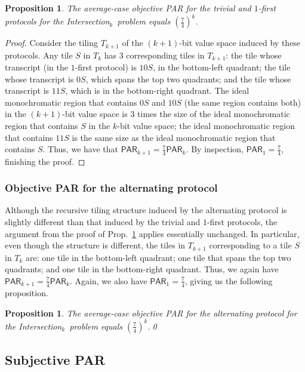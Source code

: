 \documentclass{article}
\theoremstyle{theorem}
\newtheorem{prop}[theorem]{Proposition}
\theoremstyle{definition}
\theoremstyle{remark}
\newcommand{\intersection}{{\sc In\-ter\-sec\-tion}\ensuremath{_k}}
\newcommand{\paratio}{\ensuremath{\mathsf{PAR}}}
\begin{document}
\begin{prop}\label{prop:int-ob-triv}
The average-case objective PAR for the trivial and $1$-first protocols for the \intersection\ problem equals $\left(\frac{7}{4}\right)^k$.
\end{prop}
\begin{proof}
Consider the tiling $T_{k+1}$ of the $(k+1)$-bit value space induced by these protocols.  Any tile $S$ in $T_k$ has $3$ corresponding tiles in $T_{k+1}$: the tile whose transcript (in the $1$-first protocol) is $10S$, in the bottom-left quadrant; the tile whose transcript is $0S$, which spans the top two quadrants; and the tile whose transcript is $11S$, which is in the bottom-right quadrant.  The ideal monochromatic region that contains $0S$ and $10S$ (the same region contains both) in the $(k+1)$-bit value space is $3$ times the size of the ideal monochromatic region that contains $S$ in the $k$-bit value space; the ideal monochromatic region that contains $11S$ is the same size as the ideal monochromatic region that contains $S$.  Thus, we have that $\paratio_{k+1} = \frac{7}{4}\paratio_k$.  By inspection, $\paratio_1 = \frac{7}{4}$, finishing the proof.
\end{proof}

\subsubsection{Objective PAR for the alternating protocol}

Although the recursive tiling structure induced by the alternating protocol is slightly different than that induced by the trivial and $1$-first protocols, the argument from the proof of Prop.~\ref{prop:int-ob-triv} applies essentially unchanged.  In particular, even though the structure is different, the tiles in $T_{k+1}$ corresponding to a tile $S$ in $T_k$ are: one tile in the bottom-left quadrant; one tile that spans the top two quadrants; and one tile in the bottom-right quadrant.  Thus, we again have $\paratio_{k+1} = \frac{7}{4}\paratio_k$.  Again, we also have $\paratio_1 = \frac{7}{4}$, giving us the following proposition.
\begin{prop}\label{prop:int-ob-alt}
The average-case objective PAR for the alternating protocol for the \intersection\ problem equals $\left(\frac{7}{4}\right)^k$.\hfil \qed
\end{prop}


\subsection{Subjective PAR}
\end{document}
